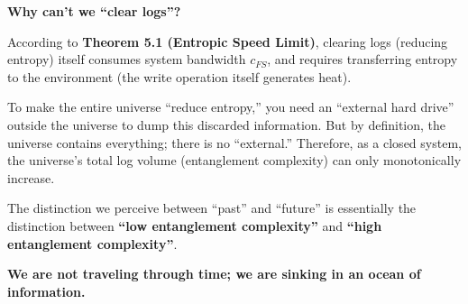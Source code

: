 \textbf{Why can't we ``clear logs''?}

According to \textbf{Theorem 5.1 (Entropic Speed Limit)}, clearing logs (reducing entropy) itself consumes system bandwidth $c_{FS}$, and requires transferring entropy to the environment (the write operation itself generates heat).

To make the entire universe ``reduce entropy,'' you need an ``external hard drive'' outside the universe to dump this discarded information. But by definition, the universe contains everything; there is no ``external.'' Therefore, as a closed system, the universe's total log volume (entanglement complexity) can only monotonically increase.

The distinction we perceive between ``past'' and ``future'' is essentially the distinction between \textbf{``low entanglement complexity''} and \textbf{``high entanglement complexity''}.

\textbf{We are not traveling through time; we are sinking in an ocean of information.}

